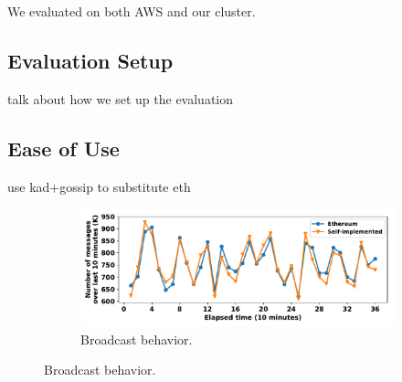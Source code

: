 We evaluated \xxx on both AWS and our cluster.

\subsection{Evaluation Setup}

talk about how we set up the evaluation

\subsection{Ease of Use}

use kad+gossip to substitute eth

\begin{figure}[ht]
  \centering
    \begin{subfigure}[b]{0.48\textwidth}
	  \includegraphics[width=\textwidth]{figures/eth_ourgossip_num_msg_on_time.pdf}
	  \caption{Broadcast behavior.}
	  \label{eth_ourgossip_num_msg_on_time}
    \end{subfigure}


\end{figure}
